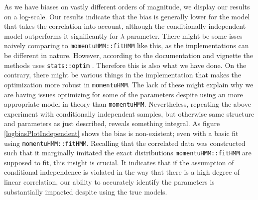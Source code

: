 As we have biases on vastly different orders of magnitude, we display our results on a log-scale. Our results indicate that the bias is generally lower for the model that takes the correlation into account, although the conditionally independent model outperforms it significantly for $\lambda$ parameter. There might be some isses naively comparing to \texttt{momentuHMM::fitHMM} like this, as the implementations can be different in nature. However, according to the documentation and vignette \cite{momentuHMM} the methods uses \texttt{stats::optim} \cite{RLang}. Therefore this is also what we have done. On the contrary, there might be various things in the implementation that makes the optimization more robust in \texttt{momentuHMM}. The lack of these might explain why we are having issues optimizing for some of the parameters despite using an more appropriate model in theory than \texttt{momentuHMM}. Nevertheless, repeating the above experiment with conditionally independent samples, but otherwise same structure and parameters as just described, reveals something integral. As figure \ref{logbiasPlotIndependent} shows the bias is non-existent; even with a basic fit using \texttt{momentuHMM::fitHMM}. Recalling that the correlated data was constructed such that it marginally imitated the exact distributions \texttt{momentuHMM::fitHMM} are supposed to fit, this insight is crucial. It indicates that if the assumption of conditional independence is violated in the way that there is a high degree of linear correlation, our ability to accurately identify the parameters is substantially impacted despite using the true models.
